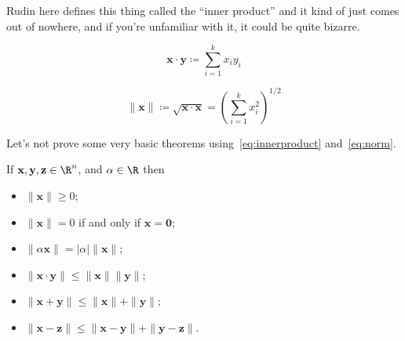 Rudin here defines this thing called the ``inner product'' and it kind of just
comes out of nowhere, and if you're unfamiliar with it, it could be quite
bizarre.

\begin{equation}\label{eq:innerproduct}
    \mathbf{x}\cdot\mathbf{y}\coloneqq\sum_{i=1}^k x_i y_i
\end{equation}

\begin{equation}\label{eq:norm}
    \|\mathbf{x}\|\coloneqq\sqrt{\mathbf{x}\cdot\mathbf{x}} = \left(\sum_{i=1}^k x_i^2\right)^{1/2}
\end{equation}

Let's not prove some very basic theorems using~\ref{eq:innerproduct} and~\ref{eq:norm}.

\begin{theorem}
    If $\mathbf{x}, \mathbf{y}, \mathbf{z}\in\R^n$, and $\alpha\in\R$ then
    \begin{itemize}
        \item $\|\mathbf{x}\| \geq 0$;
        \item $\|\mathbf{x}\| = 0$ if and only if $\mathbf{x} = \mathbf{0}$;
        \item $\|\alpha\mathbf{x}\| = |\alpha|\|\mathbf{x}\|$;
        \item $\|\mathbf{x}\cdot\mathbf{y}\| \leq \|\mathbf{x}\|\|\mathbf{y}\|$;
        \item $\|\mathbf{x} + \mathbf{y}\| \leq \|\mathbf{x}\| + \|\mathbf{y}\|$;
        \item $\|\mathbf{x} - \mathbf{z}\| \leq \|\mathbf{x} - \mathbf{y}\| + \|\mathbf{y} - \mathbf{z}\|$.
    \end{itemize}
\end{theorem}
